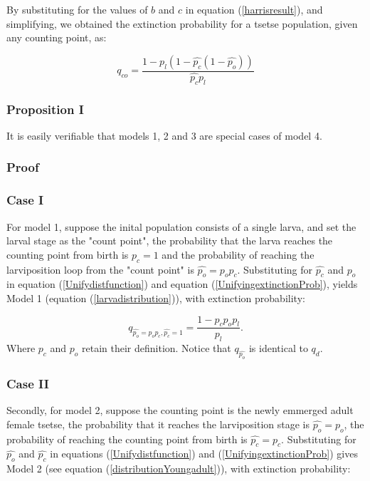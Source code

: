 By substituting for the values of  $b$ and $c$ in equation (\ref{harrisresult}), and simplifying, we obtained the extinction probability for a tsetse population, given any counting point, as:

\begin{equation}
\label{UnifyingextinctionProb}	
q_{co} = \frac{1-p_{l}(1-\hat{p_c}(1-\hat{p_o}))}{\hat{p_c}p_{l}} 
\end{equation}  

\subsubsection{\bf Proposition I}

It is easily verifiable that models 1, 2 and 3 are special cases of model 4. 

\subsubsection*{Proof}

\subsubsection*{Case I}
For model 1, suppose the inital population consists of a single larva, and  set the larval stage as the "count point", the probability that the larva reaches the counting point from birth is $\hat{p_c}=1$ and the probability of reaching the larviposition loop from the "count point" is $\hat{p_o} = p_{o}p_{c}$. Substituting for $\hat{p_c}$ and $\hat{p_o}$ in equation (\ref{Unifydistfunction}) and equation (\ref{UnifyingextinctionProb}), yields Model 1 (equation (\ref{larvadistribution})), with extinction probability:

 $$q_{\hat{p_o}=p_{o}p_{c},\hat{p_c}=1} = \frac{1-p_{c}p_{o}p_{l}}{p_{l}}.$$
Where $p_c$ and $p_o$ retain their definition. Notice that $q_{\hat{p_o}}$ is identical to $q_{d}$.  \\


\subsubsection*{Case II}
Secondly, for model 2, suppose the counting point is the newly emmerged adult female tsetse, the probability that it reaches the larviposition stage is $\hat{p_o} = p_{o}$, the probability of reaching the counting point from birth is $\hat{p_c}= p_{c}$. Substituting for $\hat{p_o}$ and $\hat{p_c}$ in equations (\ref{Unifydistfunction}) and (\ref{UnifyingextinctionProb}) gives Model 2 (see equation (\ref{distributionYoungadult})), with extinction probability: 

